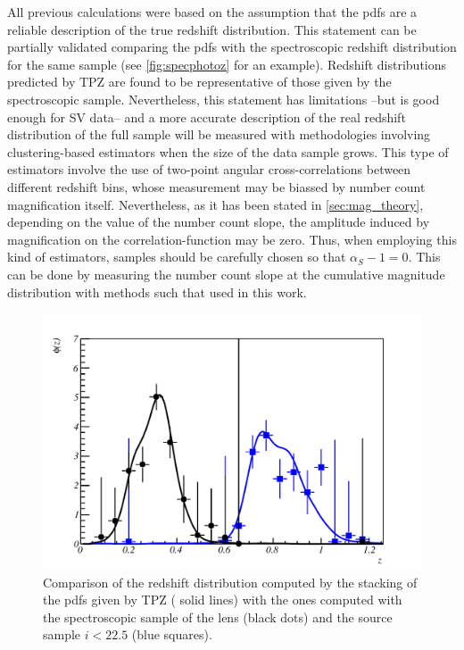 All previous calculations were based on the assumption that the pdfs are a reliable description of the true redshift distribution. This statement can be partially validated comparing the pdfs with the spectroscopic redshift distribution for the same sample (see \autoref{fig:specphotoz} for an example).  Redshift distributions predicted by TPZ are found to be representative of those given by the spectroscopic sample. Nevertheless, this statement has limitations --but is good enough for SV data-- and a more accurate description of the real redshift distribution of the full sample will be measured with methodologies involving clustering-based estimators \cite{2008ApJ...684...88N,2010ApJ...721..456M,2013arXiv1303.4722M,2016MNRAS.462.1683S} when the size of the data sample grows. This type of estimators involve the use of two-point angular cross-correlations between different redshift bins, whose measurement may be biassed by number count magnification itself. Nevertheless, as it has been stated in \autoref{sec:mag_theory}, depending on the value of the number count slope, the amplitude induced by magnification on the correlation-function may be zero. Thus, when employing this kind of estimators, samples should be carefully chosen so that $\alpha_S-1=0$. This can be done by measuring the number count slope at the cumulative magnitude distribution with methods such that used in this work.
\begin{figure}
\includegraphics[width=\textwidth]{./figures/spec_photoz_cmp.pdf}
\caption{Comparison of the redshift distribution computed by the stacking of the pdfs given by TPZ ( solid lines) with the ones computed with the spectroscopic sample of the lens (black dots) and the source sample $i<22.5$ (blue squares).}
\label{fig:specphotoz}
\end{figure}
\newline

